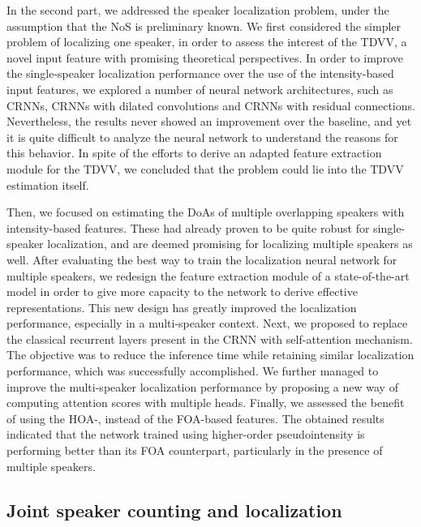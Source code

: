 In the second part, we addressed the speaker localization problem, under the assumption that the NoS is preliminary known. We first considered the simpler problem of localizing one speaker, in order to assess the interest of the TDVV, a novel input feature with promising theoretical perspectives. In order to improve the single-speaker localization performance over the use of the intensity-based input features, we explored a number of neural network architectures, such as CRNNs, CRNNs with dilated convolutions and CRNNs with residual connections. Nevertheless, the results never showed an improvement over the baseline, and yet it is quite difficult to analyze the neural network to understand the reasons for this behavior. In spite of the efforts to derive an adapted feature extraction module for the TDVV, we concluded that the problem could lie into the TDVV estimation itself. 

Then, we focused on estimating the DoAs of multiple overlapping speakers with intensity-based features. These had already proven to be quite robust for single-speaker localization, and are deemed promising for localizing multiple speakers as well. After evaluating the best way to train the localization neural network for multiple speakers, we redesign the feature extraction module of a state-of-the-art model in order to give more capacity to the network to derive effective representations. This new design has greatly improved the localization performance, especially in a multi-speaker context. Next, we proposed to replace the classical recurrent layers present in the CRNN with self-attention mechanism. The objective was to reduce the inference time while retaining similar localization performance, which was successfully accomplished. We further managed to improve the multi-speaker localization performance by proposing a new way of computing attention scores with multiple heads. Finally, we assessed the benefit of using the HOA-, instead of the FOA-based features. The obtained results indicated that the network trained using higher-order pseudointensity is performing better than its FOA counterpart, particularly in the presence of multiple speakers.

\subsection{Joint speaker counting and localization}

